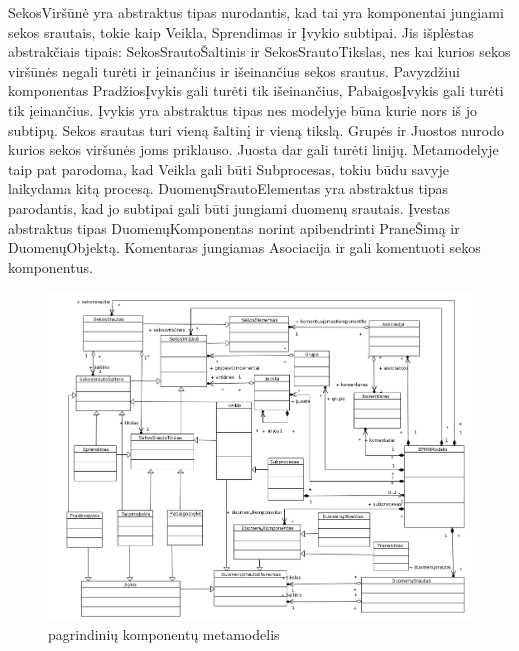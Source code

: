 SekosViršūnė yra abstraktus tipas nurodantis, kad tai yra komponentai jungiami sekos srautais, tokie kaip Veikla, Sprendimas ir Įvykio subtipai. Jis išplėstas abstrakčiais tipais: SekosSrautoŠaltinis ir SekosSrautoTikslas, nes kai kurios sekos viršūnės negali turėti ir įeinančius ir išeinančius sekos srautus. Pavyzdžiui komponentas PradžiosĮvykis gali turėti tik išeinančius, PabaigosĮvykis gali turėti tik įeinančius. Įvykis yra abstraktus tipas nes modelyje būna kurie nors iš jo subtipų. Sekos srautas turi vieną šaltinį ir vieną tikslą. Grupės ir Juostos nurodo kurios sekos viršunės joms priklauso. Juosta dar gali turėti linijų. Metamodelyje taip pat parodoma, kad Veikla gali būti Subprocesas, tokiu būdu savyje laikydama kitą procesą. DuomenųSrautoElementas yra abstraktus tipas parodantis, kad jo subtipai gali būti jungiami duomenų srautais. Įvestas abstraktus tipas DuomenųKomponentas norint apibendrinti PraneŠimą ir DuomenųObjektą. Komentaras jungiamas Asociacija ir gali komentuoti sekos komponentus.

\begin{figure}[H]
	\centering
	\includegraphics[width=\textwidth]{img/bpmn_metamodel}
	\caption{\BPMN pagrindinių komponentų metamodelis}
	\label{img:bpmn_metamodel}
\end{figure}

